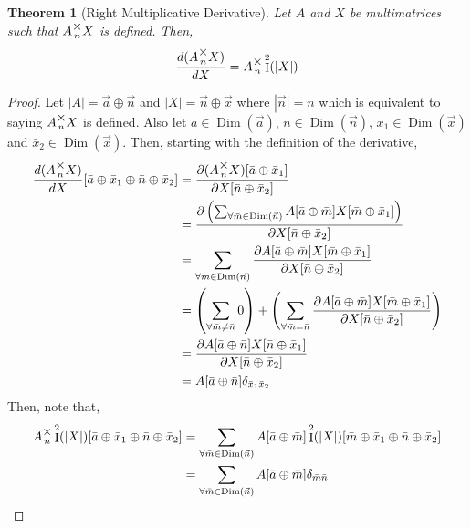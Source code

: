 \documentclass[12pt]{book}
\theoremstyle{plain}
\newtheorem{theorem}{Theorem}[chapter]
\theoremstyle{definition}
\theoremstyle{ppart}
\theoremstyle{case}
\theoremstyle{solution}
\DeclareMathOperator{\Dim}{Dim}
\DeclareMathOperator{\Ident}{I}
\newcommand{\mmult}[1]{\text{\raisebox{1ex}{$\underset{#1}{\times}$}}}
\newcommand{\shape}[1]{\left|#1\right|}
\begin{document}
\begin{theorem}[Right Multiplicative Derivative]
\label{right_mult_derivative}
Let $A$ and $X$ be multimatrices such that $A \mmult{n} X$ is
defined. Then,
\[ \frac{d(A \mmult{n} X)}{dX} = A \mmult{n} \Ident^2(\shape{X}) \]
\end{theorem}
\begin{proof}
Let $\shape{A} = \vec{a} \oplus \vec{n}$ and $\shape{X} = \vec{n} \oplus \vec{x}$
where $\shape{\vec{n}} = n$ which is equivalent to saying $A \mmult{n} X$ is defined.
Also let $\bar{a} \in \Dim(\vec{a})$, $\bar{n} \in \Dim(\vec{n})$,
$\bar{x}_1 \in \Dim(\vec{x})$ and $\bar{x}_2 \in \Dim(\vec{x})$.
Then, starting with the definition of the derivative,
\begin{align*}
  \frac{d(A\mmult{n}X)}{dX}[\bar{a} \oplus \bar{x}_1 \oplus \bar{n} \oplus \bar{x}_2]
  &=
  \frac{
    \partial (A \mmult{n} X)[\bar{a} \oplus \bar{x}_1]
  }{
    \partial X[\bar{n} \oplus \bar{x}_2]
  } \\
  &=
  \frac{
    \partial \left(
      \sum_{\forall \bar{m} \in \Dim(\vec{n})}
        A[\bar{a} \oplus \bar{m}]
        X[\bar{m} \oplus \bar{x}_1]
    \right)
  }{
    \partial X[\bar{n} \oplus \bar{x}_2]
  } \\
  &=
  \sum_{\forall \bar{m} \in \Dim(\vec{n})}
    \frac{
      \partial 
      A[\bar{a} \oplus \bar{m}]
      X[\bar{m} \oplus \bar{x}_1]
    }{
      \partial X[\bar{n} \oplus \bar{x}_2]
    } \\
  &=
  \left(
    \sum_{\forall \bar{m} \ne \bar{n}} 0
  \right)
  +
  \left(
    \sum_{\forall \bar{m} = \bar{n}}
    \frac{
      \partial 
      A[\bar{a} \oplus \bar{m}]
      X[\bar{m} \oplus \bar{x}_1]
    }{
      \partial X[\bar{n} \oplus \bar{x}_2]
    }
  \right) \\
  &=
  \frac{
    \partial 
    A[\bar{a} \oplus \bar{n}]
    X[\bar{n} \oplus \bar{x}_1]
  }{
    \partial X[\bar{n} \oplus \bar{x}_2]
  } \\
  &= A[\bar{a} \oplus \bar{n}] \delta_{\bar{x}_1 \bar{x}_2}
\end{align*}
Then, note that,
\begin{align*}
  A \mmult{n} \Ident^2(\shape{X})[\bar{a} \oplus \bar{x}_1 \oplus \bar{n} \oplus \bar{x}_2]
  &=
  \sum_{\forall \bar{m} \in \Dim(\vec{n})}
  A[\bar{a} \oplus \bar{m}]
  \Ident^2(\shape{X})[\bar{m} \oplus \bar{x}_1 \oplus \bar{n} \oplus \bar{x}_2] \\
  &=
  \sum_{\forall \bar{m} \in \Dim(\vec{n})}
  A[\bar{a} \oplus \bar{m}]
  \delta_{\bar{m} \bar{n}}

\end{align*}
\end{proof}
\end{document}
